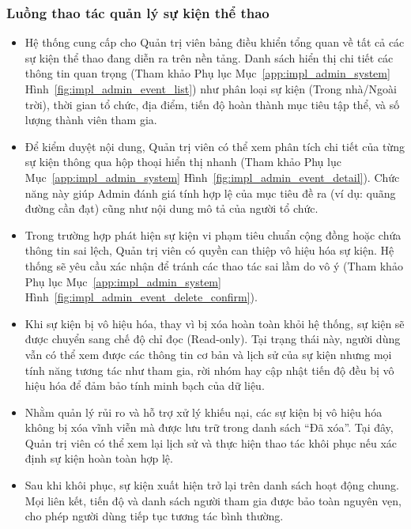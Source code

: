 \subsubsection{Luồng thao tác quản lý sự kiện thể thao}
\begin{itemize}
    \item Hệ thống cung cấp cho Quản trị viên bảng điều khiển tổng quan về tất cả các sự kiện thể thao đang diễn ra trên nền tảng. Danh sách hiển thị chi tiết các thông tin quan trọng (Tham khảo Phụ lục Mục~\ref{app:impl_admin_system} Hình~\ref{fig:impl_admin_event_list}) như phân loại sự kiện (Trong nhà/Ngoài trời), thời gian tổ chức, địa điểm, tiến độ hoàn thành mục tiêu tập thể, và số lượng thành viên tham gia.


    \item Để kiểm duyệt nội dung, Quản trị viên có thể xem phân tích chi tiết của từng sự kiện thông qua hộp thoại hiển thị nhanh (Tham khảo Phụ lục Mục~\ref{app:impl_admin_system} Hình~\ref{fig:impl_admin_event_detail}). Chức năng này giúp Admin đánh giá tính hợp lệ của mục tiêu đề ra (ví dụ: quãng đường cần đạt) cũng như nội dung mô tả của người tổ chức.


    \item Trong trường hợp phát hiện sự kiện vi phạm tiêu chuẩn cộng đồng hoặc chứa thông tin sai lệch, Quản trị viên có quyền can thiệp vô hiệu hóa sự kiện. Hệ thống sẽ yêu cầu xác nhận để tránh các thao tác sai lầm do vô ý (Tham khảo Phụ lục Mục~\ref{app:impl_admin_system} Hình~\ref{fig:impl_admin_event_delete_confirm}).


    \item Khi sự kiện bị vô hiệu hóa, thay vì bị xóa hoàn toàn khỏi hệ thống, sự kiện sẽ được chuyển sang chế độ chỉ đọc (Read-only). Tại trạng thái này, người dùng vẫn có thể xem được các thông tin cơ bản và lịch sử của sự kiện nhưng mọi tính năng tương tác như tham gia, rời nhóm hay cập nhật tiến độ đều bị vô hiệu hóa để đảm bảo tính minh bạch của dữ liệu.


    \item Nhằm quản lý rủi ro và hỗ trợ xử lý khiếu nại, các sự kiện bị vô hiệu hóa không bị xóa vĩnh viễn mà được lưu trữ trong danh sách ``Đã xóa''. Tại đây, Quản trị viên có thể xem lại lịch sử và thực hiện thao tác khôi phục nếu xác định sự kiện hoàn toàn hợp lệ.


    \item Sau khi khôi phục, sự kiện xuất hiện trở lại trên danh sách hoạt động chung. Mọi liên kết, tiến độ và danh sách người tham gia được bảo toàn nguyên vẹn, cho phép người dùng tiếp tục tương tác bình thường.

\end{itemize}

